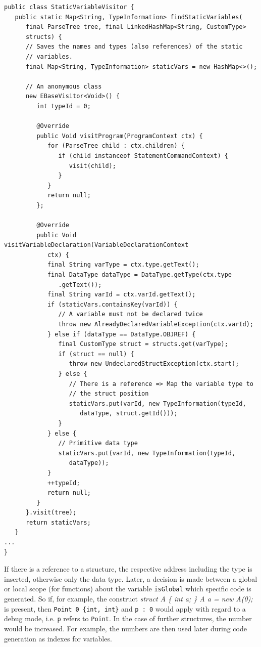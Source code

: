 \begin{lstlisting}[frame=htrbl, caption={Implementation of {\ttfamily StaticVariableVisitor.java}}, label={lst:visitor4}, basicstyle=\footnotesize]
public class StaticVariableVisitor {
   public static Map<String, TypeInformation> findStaticVariables(
      final ParseTree tree, final LinkedHashMap<String, CustomType> 
      structs) {
      // Saves the names and types (also references) of the static 
      // variables.
      final Map<String, TypeInformation> staticVars = new HashMap<>();

      // An anonymous class
      new EBaseVisitor<Void>() {
         int typeId = 0;

         @Override
         public Void visitProgram(ProgramContext ctx) {
            for (ParseTree child : ctx.children) {
               if (child instanceof StatementCommandContext) {
                  visit(child);
               }
            }
            return null;
         };

         @Override
         public Void visitVariableDeclaration(VariableDeclarationContext 
            ctx) {
            final String varType = ctx.type.getText();
            final DataType dataType = DataType.getType(ctx.type
               .getText());
            final String varId = ctx.varId.getText();
            if (staticVars.containsKey(varId)) {
               // A variable must not be declared twice
               throw new AlreadyDeclaredVariableException(ctx.varId);
            } else if (dataType == DataType.OBJREF) {
               final CustomType struct = structs.get(varType);
               if (struct == null) {
                  throw new UndeclaredStructException(ctx.start);
               } else {
                  // There is a reference => Map the variable type to  
                  // the struct position
                  staticVars.put(varId, new TypeInformation(typeId, 
                     dataType, struct.getId()));
               }
            } else {
               // Primitive data type
               staticVars.put(varId, new TypeInformation(typeId, 
                  dataType));
            }
            ++typeId;
            return null;
         }
      }.visit(tree);
      return staticVars;
   }
...
}
\end{lstlisting}

If there is a reference to a structure, the respective address including the type is inserted, otherwise only the data type. Later, a decision is made between a global or local scope (for functions) about the variable \texttt{isGlobal} which specific code is generated. So if, for example, the construct \emph{struct A \{ int a; \} A a = new A(0);} is present, then \texttt{Point 0 \{int, int\}} and \texttt{p : 0} would apply with regard to a debug mode, i.e. \texttt{p} refers to \texttt{Point}. In the case of further structures, the number would be increased. For example, the numbers are then used later during code generation as indexes for variables.

